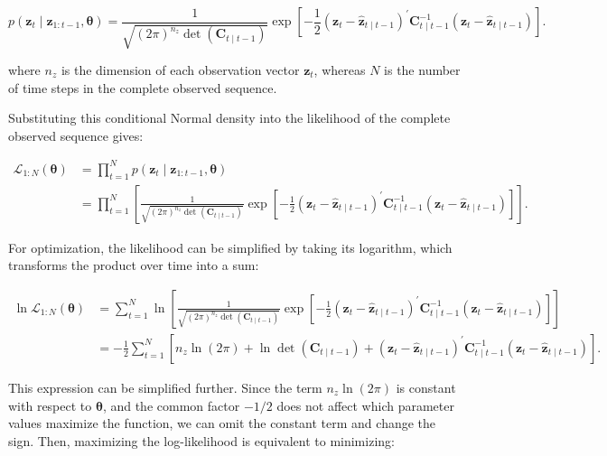 \documentclass[11pt]{article}
\newcommand{\trans}{^{\prime}}
\begin{document}
\[
p\!\left(
\mathbf{z}_t
\mid
\mathbf{z}_{1:t-1},
\boldsymbol{\theta}
\right)
=
\frac{1}{
\sqrt{
(2\pi)^{n_z}
\det\!\left(\mathbf{C}_{t\mid t-1}\right)
}
}
\exp\!\left[
-\frac{1}{2}
\left(
\mathbf{z}_t-\widehat{\mathbf{z}}_{t\mid t-1}
\right)\trans
\mathbf{C}_{t\mid t-1}^{-1}
\left(
\mathbf{z}_t-\widehat{\mathbf{z}}_{t\mid t-1}
\right)
\right].
\]

where $n_z$ is the dimension of each observation vector $\mathbf{z}_t$, whereas $N$ is the number of time steps in the complete observed sequence.

Substituting this conditional Normal density into the likelihood of the complete observed sequence gives:

\[
\begin{aligned}
\mathcal{L}_{1:N}\!\left(\boldsymbol{\theta}\right)
&=
\prod_{t=1}^{N}
p\!\left(
\mathbf{z}_t
\mid
\mathbf{z}_{1:t-1},
\boldsymbol{\theta}
\right)
\\[4pt]
&=
\prod_{t=1}^{N}
\left[
\frac{1}{
\sqrt{
(2\pi)^{n_z}
\det\!\left(\mathbf{C}_{t\mid t-1}\right)
}
}
\exp\!\left[
-\frac{1}{2}
\left(
\mathbf{z}_t-\widehat{\mathbf{z}}_{t\mid t-1}
\right)\trans
\mathbf{C}_{t\mid t-1}^{-1}
\left(
\mathbf{z}_t-\widehat{\mathbf{z}}_{t\mid t-1}
\right)
\right]
\right].
\end{aligned}
\]

For optimization, the likelihood can be simplified by taking its logarithm, which transforms the product over time into a sum:

\[
\begin{aligned}
\ln\mathcal{L}_{1:N}\!\left(\boldsymbol{\theta}\right)
&=
\sum_{t=1}^{N}
\ln\!\left[
\frac{1}{
\sqrt{
(2\pi)^{n_z}
\det\!\left(\mathbf{C}_{t\mid t-1}\right)
}
}
\exp\!\left[
-\frac{1}{2}
\left(
\mathbf{z}_t-\widehat{\mathbf{z}}_{t\mid t-1}
\right)\trans
\mathbf{C}_{t\mid t-1}^{-1}
\left(
\mathbf{z}_t-\widehat{\mathbf{z}}_{t\mid t-1}
\right)
\right]
\right]
\\[4pt]
&=
-\frac{1}{2}
\sum_{t=1}^{N}
\left[
n_z\ln(2\pi)
+
\ln\det\!\left(\mathbf{C}_{t\mid t-1}\right)
+
\left(
\mathbf{z}_t-\widehat{\mathbf{z}}_{t\mid t-1}
\right)\trans
\mathbf{C}_{t\mid t-1}^{-1}
\left(
\mathbf{z}_t-\widehat{\mathbf{z}}_{t\mid t-1}
\right)
\right].
\end{aligned}
\]

This expression can be simplified further. Since the term $n_z\ln(2\pi)$ is constant with respect to $\boldsymbol{\theta}$, and the common factor $-1/2$ does not affect which parameter values maximize the function, we can omit the constant term and change the sign. Then, maximizing the log-likelihood is equivalent to minimizing:
\end{document}
